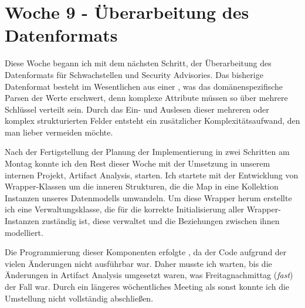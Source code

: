 \section{Woche 9 - Überarbeitung des Datenformats} \label{sec:bericht-wo-9}


\lweekdaymarginpar{\weekdayMondayLong}

Diese Woche begann ich mit dem nächsten Schritt, der Überarbeitung des Datenformats für Schwachstellen und Security Advisories.
Das bisherige Datenformat besteht im Wesentlichen aus einer , was das domänenspezifische Parsen der Werte erschwert, denn komplexe Attribute müssen so über mehrere Schlüssel verteilt sein.
Durch das Ein- und Auslesen dieser mehreren oder komplex strukturierten Felder entsteht ein zusätzlicher Komplexitätsaufwand, den man lieber vermeiden möchte.

\sweekdaymarginpar{\weekdayTuesdayShort\ - \weekdayFridayShort}

Nach der Fertigstellung der Planung der Implementierung in zwei Schritten am Montag konnte ich den Rest dieser Woche mit der Umsetzung in unserem internen Projekt, Artifact Analysis, starten.
Ich startete mit der Entwicklung von Wrapper-Klassen um die inneren  Strukturen, die die Map in eine Kollektion Instanzen unseres Datenmodells umwandeln.
Um diese Wrapper herum erstellte ich eine Verwaltungsklasse, die für die korrekte Initialisierung aller Wrapper-Instanzen zuständig ist, diese verwaltet und die Beziehungen zwischen ihnen modelliert.

Die Programmierung dieser Komponenten erfolgte , da der Code aufgrund der vielen Änderungen nicht ausführbar war.
Daher musste ich warten, bis die Änderungen in Artifact Analysis umgesetzt waren, was Freitagnachmittag (\textit{fast}) der Fall war.
Durch ein längeres wöchentliches Meeting als sonst konnte ich die Umstellung nicht vollständig abschließen.
